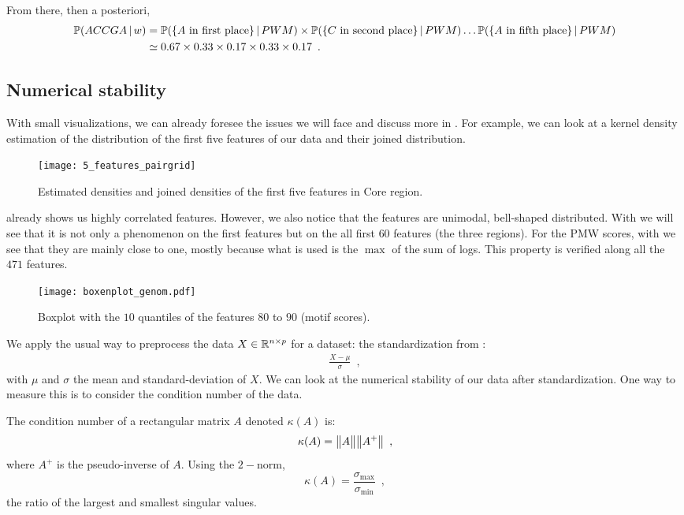 \documentclass[../main.tex]{subfiles}
\begin{document}
From there, then a posteriori,
\begin{align*}
\mathbb{P}(ACCGA\,|\, w)
&= \mathbb{P}(\{A\text{ in first place}\}\,|\, PWM)\times \mathbb{P}(\{C\text{ in second place}\}\,|\, PWM)\dots \mathbb{P}(\{A\text{ in fifth place}\}\,|\, PWM) \\
&\simeq 0.67\times 0.33\times 0.17\times 0.33\times 0.17\enspace.
\end{align*}

\subsection{Numerical stability}\label{sub:num_stability}

With small visualizations, we can already foresee the issues we will face and discuss more in .
For example, we can look at a kernel density estimation of the distribution of
the first five features of our data and their joined distribution.
\begin{figure}[ht]
    \centering
    \texttt{[image: 5\_features\_pairgrid]}
    \caption{Estimated densities and joined densities of the first five features
    in Core region.}
    \label{5coreplots}
\end{figure}

 already shows us highly correlated features.
However, we also notice that the features are unimodal, bell-shaped distributed.
With  we will see that it is not only a phenomenon on the
first features but on the all first $60$ features (the three regions).
For the PMW scores, with  we see that they are mainly close to one,
mostly because what is used is the $\max$ of the sum of logs.
This property is verified along all the $471$ features.

\begin{figure}[ht]
    \centering
    \texttt{[image: boxenplot\_genom.pdf]}
    \caption{Boxplot with the $10$ quantiles of the features $80$ to $90$
    (motif scores).}
    \label{fig:pmw}
\end{figure}

We apply the usual way to preprocess the data $X \in \mathbb{R}^{n\times p}$ for a dataset:
the standardization from :
\begin{align} \label{eq:standard}
    \frac{X - \mu}{\sigma}\enspace,
\end{align}
with $\mu$ and $\sigma$ the mean and standard-deviation of $X$.
We can look at the numerical stability of our data after standardization.
One way to measure this is to consider the condition number of the data.
\begin{definition}
The condition number of a rectangular matrix $A$ denoted $\kappa(A)$ is:
\[\kappa(A) = \big \lVert A \big \rVert\big \lVert A^+ \big \rVert\enspace,\]
where $A^+$ is the pseudo-inverse of $A$. Using the $2-$norm,
\[\kappa(A) = \frac{\sigma_{\max}}{\sigma_{\min}}\enspace,\]
the ratio of the largest and smallest singular values.
\end{definition}
\end{document}
